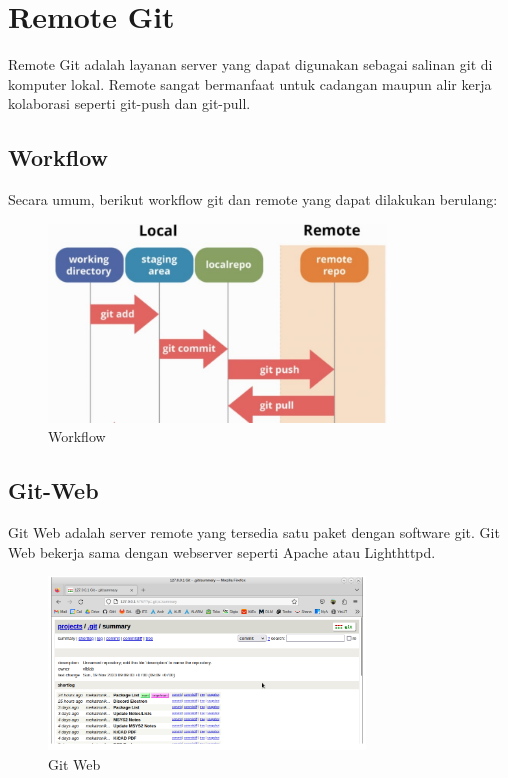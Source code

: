 \documentclass[12pt]{book}
\begin{document}
	\newpage
	\section{Remote Git}
	
	Remote Git adalah layanan server yang dapat digunakan sebagai salinan git di komputer lokal.
	Remote sangat bermanfaat untuk cadangan maupun alir kerja kolaborasi seperti git-push dan git-pull.
	
	\subsection{Workflow}
	
	Secara umum, berikut workflow git dan remote yang dapat dilakukan berulang:
	
	\begin{figure}[!ht]
		\centering
		\includegraphics[width=0.8\textwidth]{images/git/githubworkflow}
		\caption{Workflow}
	\end{figure}
	
	\subsection{Git-Web}
	
	Git Web adalah server remote yang tersedia satu paket dengan software git.
	Git Web bekerja sama dengan webserver seperti Apache atau Lighthttpd.
	
	\begin{figure}[!ht]
		\centering
		\includegraphics[width=0.75\textwidth]{images/git/gitweb}
		\caption{Git Web}
	\end{figure}
	
\end{document}
